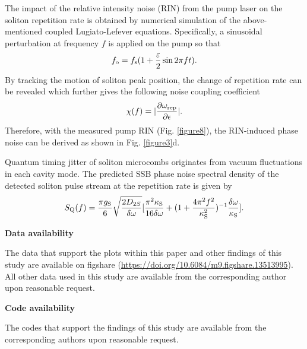 \documentclass[noshowpacs,amsmath,
twocolumn,
superscriptaddress,
8pt,
aps,prb]{revtex4-2}
\begin{document}
\begin{footnotesize}
\noindent The impact of the relative intensity noise (RIN) from the pump laser on the soliton repetition rate is obtained by numerical simulation of the above-mentioned coupled Lugiato-Lefever equations. Specifically, a sinusoidal perturbation at frequency $f$ is applied on the pump so that 
\begin{equation}
    f_{\rm o}=f_{\rm s}(1+\frac{\varepsilon}{2} \sin{2\pi f t}).
\end{equation}
By tracking the motion of soliton peak position, the change of repetition rate can be revealed which further gives the following noise coupling coefficient
\begin{equation}
    \chi(f)=|\frac{\partial\omega_{\rm rep}}{\partial\epsilon}|.
\end{equation}
Therefore, with the measured pump RIN (Fig. \ref{figure8}), the RIN-induced phase noise can be derived as shown in Fig. \ref{figure3}d. 

\medskip


\noindent Quantum timing jitter of soliton microcombs originates from vacuum fluctuations in each cavity mode. The predicted SSB phase noise spectral density of the detected soliton pulse stream at the repetition rate is given by \cite{matsko2013timing}
\begin{equation}
    S_{\rm Q}(f)=\frac{\pi g_{\rm S}}{6} \sqrt{\frac{2D_{2S}}{\mathrm{\delta \omega}}}
    [\frac{\pi^{2}\kappa_{\rm S}}{16\mathrm{\delta \omega}}+(1+\frac{4\pi^{2}f^{2}}{\kappa_{\rm S}^{2}})^{-1}\frac{\mathrm{\delta \omega}}{\kappa_{\rm S}}].
\end{equation}

\end{footnotesize}

\noindent\textbf{Data availability}

\begin{footnotesize}
\noindent The data that support the plots within this paper and other findings of this study are available on figshare (\href{https://doi.org/10.6084/m9.figshare.13513995}{https://doi.org/10.6084/m9.figshare.13513995}). All other data used in this study are available from the corresponding author upon reasonable request.
\end{footnotesize}

\noindent\textbf{Code availability}

\begin{footnotesize}
\noindent The codes that support the findings of this study are available from the corresponding authors upon reasonable request. 
\end{footnotesize}
\end{document}
